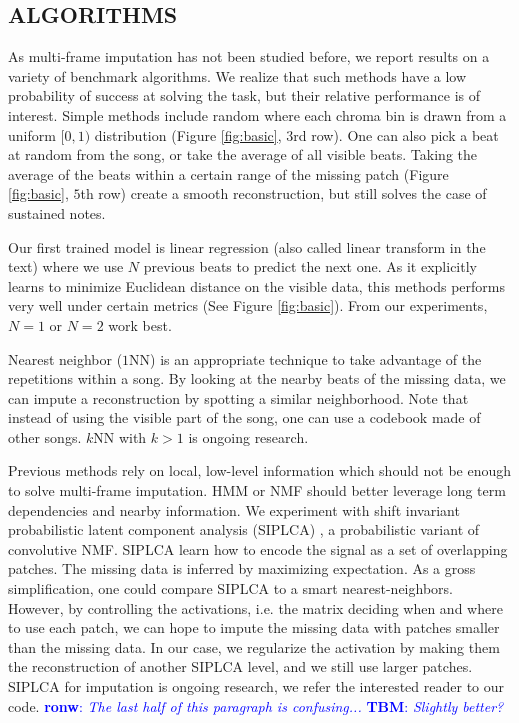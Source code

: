 \documentclass{article}
\newcommand{\FIXME}[2][FIXME]{\textcolor{blue}{\textbf{#1}: \emph{#2}}}
\begin{document}
\subsection{ALGORITHMS}
\label{ssec:algo}
As multi-frame imputation has not been studied before, we report
results on a variety of benchmark algorithms. We realize that such
methods have a low probability of success at solving the task, but
their relative performance is of interest.  Simple methods include
random where each chroma bin is drawn from a uniform $[0,1)$
distribution (Figure \ref{fig:basic}, $3$rd row).  One can also pick a
beat at random from the song, or take the average of all visible
beats. Taking the average of the beats within a certain range
of the missing patch (Figure \ref{fig:basic}, $5$th row) create a
smooth reconstruction, but still solves the case of sustained notes.

Our first trained model is linear regression (also called linear
transform in the text) where we use $N$ previous beats to predict the
next one.  As it explicitly learns to minimize Euclidean distance on
the visible data, this methods performs very well under certain
metrics (See Figure \ref{fig:basic}). From our experiments, $N=1$ or
$N=2$ work best.

Nearest neighbor ($1$NN) is an appropriate technique
to take advantage of the repetitions within a song. By looking at the
nearby beats of the missing data, we can impute a reconstruction by
spotting a similar neighborhood. Note that instead of using the
visible part of the song, one can use a codebook made of
other songs.  $k$NN with $k>1$ is ongoing research.

Previous methods rely on local, low-level information which should not
be enough to solve multi-frame imputation. HMM or NMF should better
leverage long term dependencies and nearby information.  We experiment
with shift invariant probabilistic latent component analysis
(SIPLCA) \cite{Smaragdis2009,Weiss2010}, a probabilistic
variant of convolutive NMF. SIPLCA learn how to encode the signal as a
set of overlapping patches. The missing data is inferred by maximizing
expectation. As a gross simplification, one  could compare SIPLCA to
a smart nearest-neighbors. However, by controlling the activations, 
i.e. the matrix deciding when and where to use each patch, we can
hope to impute the missing data with patches smaller than the
missing data. In our case, we regularize the activation by
making them the reconstruction of another SIPLCA level, and we
still use larger patches. SIPLCA for imputation is ongoing research,
we refer the interested reader to our code.
\FIXME[ronw]{The last half of this paragraph is confusing...}
\FIXME[TBM]{Slightly better?}
\end{document}
